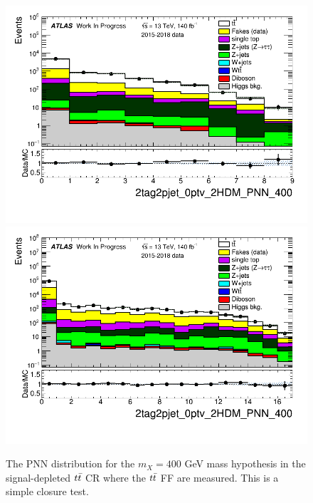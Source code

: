 \begin{figure}
\centering
\includegraphics[width=.45\textwidth]{DiHiggs/plots/lephadFF/LTT/2tag2pjet_0ptv_2HDM_PNN_400_SR_ALLFAKES_LTT_ttCR_noNeg_log.png}
\includegraphics[width=.45\textwidth]{DiHiggs/plots/lephadFF/SLT/2tag2pjet_0ptv_2HDM_PNN_400_SR_ALLFAKES_SLT_ttCR_noNeg_log.png}\\
\caption{The PNN distribution for the $m_{X} = 400$ GeV mass hypothesis in the signal-depleted $t\bar{t}$ CR where the $t\bar{t}$ FF are measured. This is a simple closure test.} 
\label{fig:ttCR_val}
\end{figure}



